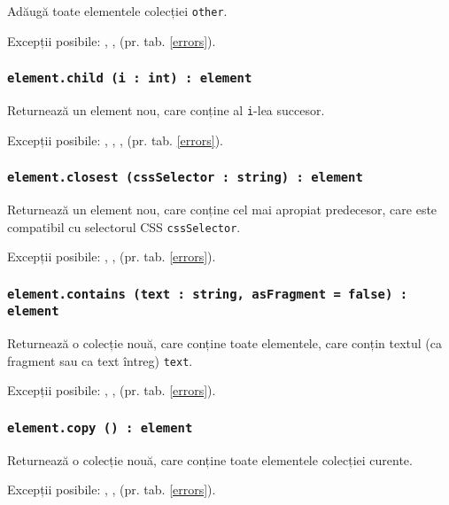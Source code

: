 Adăugă toate elementele colecției \texttt{other}.

Excepții posibile: , ,  (pr. tab. \ref{errors}).

\subsubsection{\texttt{element.child (i : int) : element}}

Returnează un element nou, care conține al \texttt{i}-lea succesor.

Excepții posibile: , , ,  (pr. tab. \ref{errors}).

\subsubsection{\texttt{element.closest (cssSelector : string) : element}}

Returnează un element nou, care conține cel mai apropiat predecesor, care este compatibil cu selectorul CSS \texttt{cssSelector}.

Excepții posibile: , ,  (pr. tab. \ref{errors}).

\subsubsection{\texttt{element.contains (text : string, asFragment = false) : element}}

Returnează o colecție nouă, care conține toate elementele, care conțin textul (ca fragment sau ca text întreg) \texttt{text}.

Excepții posibile: , ,  (pr. tab. \ref{errors}).

\subsubsection{\texttt{element.copy () : element}}

Returnează o colecție nouă, care conține toate elementele colecției curente.

Excepții posibile: , ,  (pr. tab. \ref{errors}).

